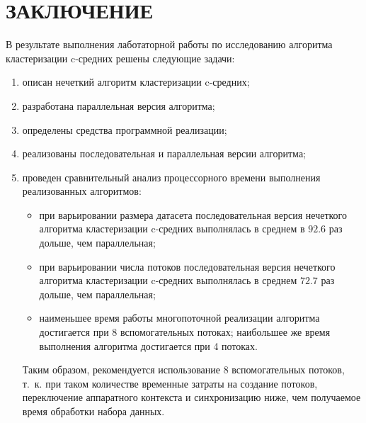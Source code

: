 \chapter*{ЗАКЛЮЧЕНИЕ}

В результате выполнения лаботаторной работы по исследованию алгоритма кластеризации c-средних решены следующие задачи:
\begin{enumerate}
	\item описан нечеткий алгоритм кластеризации c-средних;
	\item разработана параллельная версия алгоритма;
	\item определены средства программной реализации;
	\item реализованы последовательная и параллельная версии алгоритма;
	\item проведен сравнительный анализ процессорного времени выполнения реализованных алгоритмов:
	\begin{itemize}
		\item при варьировании размера датасета последовательная версия нечеткого алгоритма кластеризации c-средних выполнялась в среднем в $92.6$ раз дольше, чем параллельная; 
		\item при варьировании числа потоков последовательная версия нечеткого алгоритма кластеризации c-средних выполнялась в среднем $72.7$ раз дольше, чем параллельная;
		\item наименьшее время работы многопоточной реализации алгоритма достигается при 8 вспомогательных потоках; наибольшее же время выполнения алгоритма достигается при 4 потоках.
	\end{itemize}
	
	Таким образом, рекомендуется использование 8 вспомогательных потоков, т.~к. при таком количестве временные затраты на создание потоков, переключение аппаратного контекста и синхронизацию ниже, чем получаемое время обработки набора данных.
\end{enumerate}